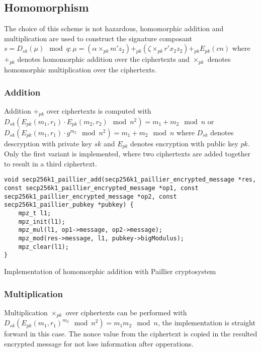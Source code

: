 \subsection{Homomorphism}

The choice of this scheme is not hazardous, homomorphic addition and
multiplication are used to construct the signature composant $s = D_{sk}(\mu)
\mod q : \mu = (\alpha \times_{pk} m'z_2) +_{pk} (\zeta \times_{pk} r'x_2z_2)
+_{pk} E_{pk}(cn)$ where $+_{pk}$ denotes homomorphic addition over the
ciphertexts and $\times_{pk}$ denotes homomorphic multiplication over the
ciphertexts.

\subsubsection{Addition}
Addition $+_{pk}$ over ciphertexts is computed with $D_{sk}(E_{pk}(m_1, r_1)
\cdot E_{pk}(m_2, r_2) \mod n^2) = m_1 + m_2 \mod n$ or $D_{sk}(E_{pk}(m_1, r_1)
\cdot g^{m_2} \mod n^2) = m_1 + m_2 \mod n$ where $D_{sk}$ denotes descryption
with private key $sk$ and $E_{pk}$ denotes encryption with public key $pk$. Only
the first variant is implemented, where two ciphertexts are added together to
result in a third ciphertext.

\begin{listing}
  \begin{verbatim}
void secp256k1_paillier_add(secp256k1_paillier_encrypted_message *res, const secp256k1_paillier_encrypted_message *op1, const secp256k1_paillier_encrypted_message *op2, const secp256k1_paillier_pubkey *pubkey) {
    mpz_t l1;
    mpz_init(l1);
    mpz_mul(l1, op1->message, op2->message);
    mpz_mod(res->message, l1, pubkey->bigModulus);
    mpz_clear(l1);
}
  \end{verbatim}
	\caption{Implementation of homomorphic addition with Paillier cryptosystem}
	\label{lst:implHomomorphAddPaillier}
\end{listing}

\subsubsection{Multiplication}

Multiplication $\times_{pk}$ over ciphertexts can be performed with
$D_{sk}(E_{pk}(m_1, r_1)^{m_2} \mod n^2) = m_1 m_2 \mod n$, the implementation
is straight forward in this case. The nonce value from the ciphertext is copied
in the resulted encrypted message for not lose information after opperations.

